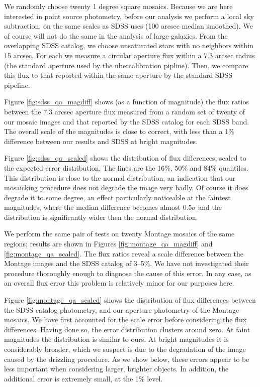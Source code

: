 \documentclass[10pt,preprint]{aastex}
\begin{document}
We randomly choose twenty 1 degree square mosaics. Because we are here
interested in point source photometry, before our analysis we perform
a local sky subtraction, on the same scales as SDSS uses (100 arcsec
median smoothed).  We of course will not do the same in the analysis
of large galaxies. From the overlapping SDSS catalog, we choose
unsaturated stars with no neighbors within 15 arcsec.  For each we
measure a circular aperture flux within a 7.3 arcsec radius (the
standard aperture used by the ubercalibration pipline).  Then, we
compare this flux to that reported within the same aperture by the
standard SDSS pipeline.

Figure \ref{fig:sdss_qa_magdiff} shows (as a function of magnitude)
the flux ratios between the 7.3 arcsec aperture flux measured from a
random set of twenty of our mosaic images and that reported by the
SDSS catalog for each SDSS band. The overall scale of the magnitudes
is close to correct, with less than a 1\% difference between our
results and SDSS at bright magnitudes.

Figure \ref{fig:sdss_qa_scaled} shows the distribution of flux
differences, scaled to the expected error distribution. The lines are
the 16\%, 50\% and 84\% quantiles. This distribution is close to the
normal distribution, an indication that our mosaicking procedure does
not degrade the image very badly.  Of course it does degrade it to
some degree, an effect particularly noticeable at the faintest
magnitudes, where the median difference becomes almost 0.5$\sigma$ and
the distribution is significantly wider then the normal distribution.

We perform the same pair of tests on twenty Montage mosaics of the
same regions; results are shown in Figures
\ref{fig:montage_qa_magdiff} and \ref{fig:montage_qa_scaled}.  The
flux ratios reveal a scale difference between the Montage
images and the SDSS catalog of 3--5\%.
We have not investigated their procedure thoroughly enough to diagnose
the cause of this error.  In any case, as an overall flux error this
problem is relatively minor for our purposes here.

Figure \ref{fig:montage_qa_scaled} shows the distribution of flux
differences between the SDSS catalog photometry, and our aperture
photometry of the Montage mosaics. We have first accounted for the
scale error before considering the flux differences. Having done so,
the error distribution clusters around zero.  At faint magnitudes the
distribution is similar to ours. At bright magnitudes it is
considerably broader, which we suspect is due to the degradation of
the image caused by the drizzling procedure. As we show below, these
errors appear to be less important when considering larger, brighter
objects. In addition, the additional error is extremely small, at the
1\% level.
\end{document}
